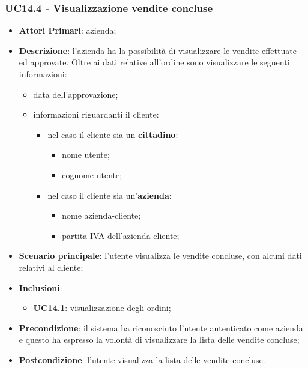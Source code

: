 \subsubsection{UC14.4 - Visualizzazione vendite concluse}
\begin{itemize}
	\item \textbf{Attori Primari}: azienda;
	\item \textbf{Descrizione}: l'azienda ha la possibilità di visualizzare le vendite effettuate ed approvate. Oltre ai dati relative all'ordine sono visualizzare le seguenti informazioni:
		\begin{itemize}
		\item data dell'approvazione;
		\item informazioni riguardanti il cliente:
		\begin{itemize}
			\item nel caso il cliente sia un \textbf{cittadino}:
			\begin{itemize}
				
				\item nome utente;
				\item cognome utente;
			\end{itemize}
			\item nel caso il cliente sia un'\textbf{azienda}:
			\begin{itemize}
				
				\item nome azienda-cliente;
				\item partita IVA dell'azienda-cliente;
			\end{itemize}
		\end{itemize}
		
	\end{itemize}
	\item \textbf{Scenario principale}:  l'utente visualizza le vendite concluse, con alcuni dati relativi al cliente; 
	\item \textbf{Inclusioni}:
	\begin{itemize}
		\item \textbf{UC14.1}: visualizzazione degli ordini;
	\end{itemize}
	\item \textbf{Precondizione}: il sistema ha riconosciuto l'utente autenticato come azienda e questo ha espresso la volontà di visualizzare la lista delle vendite concluse;
	\item \textbf{Postcondizione}: l'utente visualizza la lista delle vendite concluse.
\end{itemize}



